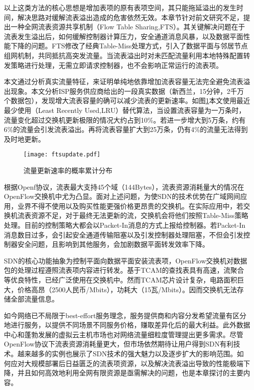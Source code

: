 以上这类方法的核心思想是增加表项的原有表项空间，其只能拖延溢出的发生时间，解决思路对缓解流表溢出造成的危害依然无效。本章节针对前文研究不足，提出一种全网流表资源共享机制（Flow Table Sharing,FTS）。其关键解决问题在于流表发生溢出后，如何缓解控制器计算压力，安全通道消息风暴，以及数据平面性能下降的问题。FTS修改了经典Table-Miss处理方式，引入了数据平面与邻居节点组网机制，共同抵抗高突发流量。当流表溢出时对未匹配流量利用本地特殊配置转发策略进行处理，无需立即请求控制器，也不会影响正常运行的流表项。




本文通过分析真实流量特征，来证明单纯地依靠增加流表容量无法完全避免流表溢出现象。本文分析ISP服务供应商给出的一段真实数据（新西兰，15分钟，2千万个数据包），发现增大流表容量的确可以减少流表的更新速率。如图\ref{fig:ftsupdate}本文使用最近最少使用（Least Recently Used,LRU）替代算法，当设置流表容量为一万条时，流量变化超过交换机更新极限的情况大约占到10\%。若进一步增大到5万条，约有6\%的流量会引发流表溢出。再将流表容量扩大到25万条，仍有4\%的流量无法得到及时地更新。

\begin{figure}[!ht]
	\centering 
	\texttt{[image: ftsupdate.pdf]}
	\caption{流量更新速率的概率累计分布} \label{fig:ftsupdate}
\end{figure}

根据Openf协议，流表最大支持45个域（144Bytes），流表资源消耗量大的情况在OpenFlow交换机中尤为凸显。面对上述问题，为使SDN的技术优势在广域网间应用，业界不得不使用以及购买性能更强价格更昂贵的交换机。在实际应用中，若交换机流表资源不足，对于最终无法更新的流，交换机会将他们按照Table-Miss策略处理。目前的控制策略大都会以Packet-In消息的方式上报给控制器。若Packet-In消息数目过多，会引起安全通道传输阻塞以及引发控制器处理阻塞，不但会引发控制器安全问题，且影响到其他服务，会加剧数据平面转发效率下降。


SDN的核心功能抽象为控制平面向数据平面安装流表项，OpenFlow交换机对数据包的处理过程遵照流表项内容进行转发。基于TCAM的查找表具有高速，流聚合等优良特性，已经广泛使用在交换机中。然而TCAM芯片设计复杂，电路面积巨大，价格高昂（2500人民币/Mbits），功耗大（15瓦/Mbits）。因而交换机无法存储全部流量信息。

如今网络已不局限于best-effort服务理念，服务提供商和内容分发希望流量有区分地进行服务，以提供不同场景不同服务价格，赚取差异化后的最大利益。此外数据中心和蓬勃发展的虚拟云主机市场也对网络流量细粒度管理提出更多需求。尽管OpenFlow协议下流表资源消耗量更大，但市场依然期待让用户得到SDN有利技术。越来越多的实例也展示了SDN技术的强大魅力以及逐步扩大的影响范围。如何应对大规模部署后日益匮乏的流表项资源，以及解决流表溢出导致的性能极端下降，并且如何高效地利用全网有限资源是亟需解决的问题，也是本章探讨的主要内容。


